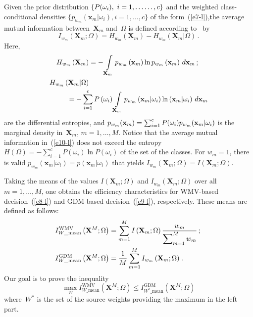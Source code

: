 \begin{multicols}{2}
\noindent  
Given the prior distribution $\{ P(\omega_i),\ i=1,\ldots\linebreak \ldots ,c\}$ and the weighted 
class-conditional densities $\{ p_{w_m}(\mathbf{x}_m\vert\omega_i), i=1,\ldots 
,c\}$ of the form~(\ref{e7-l}),the average mutual information 
between~$\mathbf{X}_m$ and~$\Omega$ is defined according to~\cite{7-l} by 
\begin{equation}
I_{w_m}\left(\mathbf{X}_m;\Omega\right) =H_{w_m}\left(\mathbf{X}_m\right) 
-H_{w_m} \left(\mathbf{X}_m\vert\Omega\right)\,.
\label{e10-l}
\end{equation}
Here,
\begin{align*}
H_{w_m}\left(\mathbf{X}_m\right) &=-\int\limits_{\mathbf{X}_m} p_{w_m} 
\left(\mathbf{x}_m\right) \ln p_{w_m} 
\left(\mathbf{x}_m\right)\,d\mathbf{x}_m\,;\\
H_{w_m}\left(\mathbf{X}_m\vert \Omega\right) &\\
&\hspace*{-11mm}{}=-\sum\limits^c_{i=1} 
P\left(\omega_i\right) \int\limits_{ \mathbf{X}_m} 
p_{w_m}\left(\mathbf{x}_m\vert \omega_i\right) \ln 
\left(\mathbf{x}_m\vert\omega_i\right)\,d\mathbf{x}_m
\end{align*}
are the differential entropies, and 
$p_{w_m}(\mathbf{x}_m)\linebreak =\sum\nolimits^c_{i=1} P(\omega_i) 
p_{w_m}(\mathbf{x}_m\vert \omega_i)$ is the marginal density 
in~$\mathbf{X}_m$, $m=1,\ldots ,M$. Notice that the average mutual information 
in~(\ref{e10-l}) does not exceed the entropy $H(\Omega)=-\sum\nolimits^c_{i=1} 
P(\omega_i)\ln P(\omega_i)$ of the set of the classes. For $w_m=1$, there is valid 
$p_{w_m}(\mathbf{x}_m\vert \omega_i)=p(\mathbf{x}_m\vert \omega_i)$  that 
yields $I_{w_m}(\mathbf{X}_m;\Omega)=I(\mathbf{X}_m;\Omega)$. 

Taking the means of the values 
$I\left(\mathbf{X}_m; \Omega\right)$  and $I_{w_m}(\mathbf{X}_m;\Omega)$ 
over all $m=1,\ldots , 
M$, one obtains the efficiency characteristics for WMV-based decision~(\ref{e8-l}) 
and GDM-based decision~(\ref{e9-l}), respectively. These means are defined as 
follows: 
\begin{align}
\hspace*{-2mm}I^{\mathrm{WMV}}_{W\_\mathrm{mean}}\left(\mathbf{X}^M;\Omega\right) &= 
\sum\limits^M_{m=1} I\left(\mathbf{X}_m;\Omega\right) 
\fr{w_m}{\sum\nolimits^M_{m=1} w_m}\,;\!\!\label{e11-l}\\
\hspace*{-2mm}I^{\mathrm{GDM}}_{W\_\mathrm{mean}} \left(\mathbf{X}^M;\Omega\right) &= \fr{1}{M} 
\sum\limits^M_{m=1} I_{w_m} \left(\mathbf{X}_m;\Omega\right)\,.
\label{e12-l}
\end{align}
Our goal is to prove the inequality 
\begin{equation}
\max\limits_W I^{\mathrm{WMV}}_{W\_\mathrm{mean}} \left(\mathbf{X}^M;\Omega\right) \leq 
I^{\mathrm{GDM}}_{W^*\_\mathrm{mean}} \left(\mathbf{X}^M;\Omega\right)
\label{e13-l}
\end{equation}
where~$W^*$ is the set of the source weights providing the maximum in the left 
part. 


\end{multicols}
